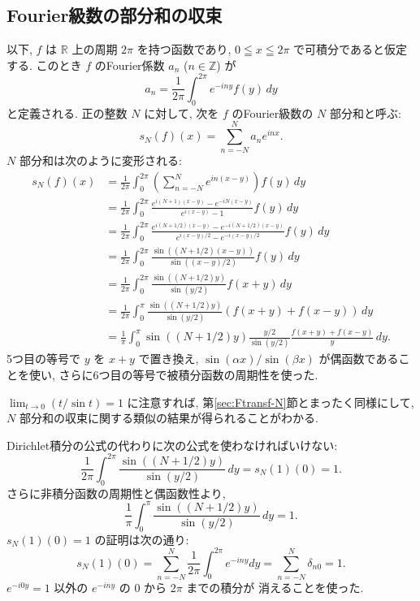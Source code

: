 \documentclass[12pt,twoside]{jarticle}
\newcommand\Z{{\mathbb Z}} %
\newcommand\R{{\mathbb R}} %
\theoremstyle{jplain}
\theoremstyle{jplain}
\theoremstyle{jplain}
\numberwithin{theorem}{section}
\numberwithin{equation}{section}
\numberwithin{figure}{section}
\numberwithin{table}{section}
\newcommand\secref[1]{第\ref{#1}節}
\begin{document}
\subsection{Fourier級数の部分和の収束}
\label{sec:Fseries-N}

以下, $f$ は $\R$ 上の周期 $2\pi$ を持つ函数であり, 
$0\leqq x\leqq 2\pi$ で可積分であると仮定する.
このとき $f$ のFourier係数 $a_n$ ($n\in\Z$) が
\[
a_n = \frac{1}{2\pi}\int_0^{2\pi} e^{-iny}f(y)\,dy
\]
と定義される. 正の整数 $N$ に対して, 
次を $f$ のFourier級数の $N$ 部分和と呼ぶ:
\[
s_N(f)(x) = \sum_{n=-N}^N a_n e^{inx}.
\]
$N$ 部分和は次のように変形される:
\begin{align*}
s_N(f)(x)
&=\frac{1}{2\pi}\int_0^{2\pi}
\left(\sum_{n=-N}^N e^{in(x-y)}\right) f(y)\,dy
\\ &
=\frac{1}{2\pi}\int_0^{2\pi}
\frac{e^{i(N+1)(x-y)}-e^{-iN(x-y)}}{e^{i(x-y)}-1} f(y)\,dy
\\ &
=\frac{1}{2\pi}\int_0^{2\pi}
\frac{e^{i(N+1/2)(x-y)}-e^{-i(N+1/2)(x-y)}}{e^{i(x-y)/2}-e^{-i(x-y)/2}} f(y)\,dy
\\ &
=\frac{1}{2\pi}\int_0^{2\pi}
\frac{\sin((N+1/2)(x-y))}{\sin((x-y)/2)} f(y)\,dy
\\ &
=\frac{1}{2\pi}\int_0^{2\pi}
\frac{\sin((N+1/2)y)}{\sin(y/2)}f(x+y)\,dy
\\ &
=\frac{1}{2\pi}\int_0^{\pi}
\frac{\sin((N+1/2)y)}{\sin(y/2)}(f(x+y)+f(x-y))\,dy
\\ &
=\frac{1}{\pi}\int_0^{\pi}
\sin((N+1/2)y)\frac{y/2}{\sin(y/2)}\frac{f(x+y)+f(x-y)}{y}\,dy.
\end{align*}
5つ目の等号で $y$ を $x+y$ で置き換え, 
$\sin(\alpha x)/\sin(\beta x)$ が偶函数であることを使い,
さらに6つ目の等号で被積分函数の周期性を使った.

$\lim_{t\to 0}(t/\sin t)=1$ に注意すれば, 
\secref{sec:Ftransf-N}とまったく同様にして, 
$N$ 部分和の収束に関する類似の結果が得られることがわかる.


Dirichlet積分の公式の代わりに次の公式を使わなければいけない:
\[
\frac{1}{2\pi}\int_0^{2\pi}
\frac{\sin((N+1/2)y)}{\sin(y/2)}\,dy
= s_N(1)(0)=1.
\]
さらに非積分函数の周期性と偶函数性より,
\[
\frac{1}{\pi}\int_0^{\pi}\frac{\sin((N+1/2)y)}{\sin(y/2)}\,dy
= 1.
\]
$s_N(1)(0)=1$ の証明は次の通り:
\[
s_N(1)(0)
=\sum_{n=-N}^N \frac{1}{2\pi}\int_0^{2\pi}e^{-iny}dy
=\sum_{n=-N}^N \delta_{n0}
=1.
\]
$e^{-i0y}=1$ 以外の $e^{-iny}$ の $0$ から $2\pi$ までの積分が
消えることを使った.
\end{document}
